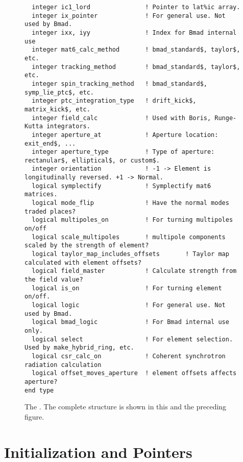 \begin{figure}[tb]
\begin{verbatim}
  integer ic1_lord               ! Pointer to lat%ic array.
  integer ix_pointer             ! For general use. Not used by Bmad.
  integer ixx, iyy               ! Index for Bmad internal use
  integer mat6_calc_method       ! bmad_standard$, taylor$, etc.
  integer tracking_method        ! bmad_standard$, taylor$, etc.
  integer spin_tracking_method   ! bmad_standard$, symp_lie_ptc$, etc.
  integer ptc_integration_type   ! drift_kick$, matrix_kick$, etc.
  integer field_calc             ! Used with Boris, Runge-Kutta integrators.
  integer aperture_at            ! Aperture location: exit_end$, ...
  integer aperture_type          ! Type of aperture: rectanular$, elliptical$, or custom$. 
  integer orientation            ! -1 -> Element is longitudinally reversed. +1 -> Normal.
  logical symplectify            ! Symplectify mat6 matrices.
  logical mode_flip              ! Have the normal modes traded places?
  logical multipoles_on          ! For turning multipoles on/off
  logical scale_multipoles       ! multipole components scaled by the strength of element?
  logical taylor_map_includes_offsets       ! Taylor map calculated with element offsets?
  logical field_master           ! Calculate strength from the field value?
  logical is_on                  ! For turning element on/off.
  logical logic                  ! For general use. Not used by Bmad.
  logical bmad_logic             ! For Bmad internal use only.
  logical select                 ! For element selection. Used by make_hybrid_ring, etc.
  logical csr_calc_on            ! Coherent synchrotron radiation calculation
  logical offset_moves_aperture  ! element offsets affects aperture?          
end type
\end{verbatim}
\caption[The  (part 2).]{The . 
The complete structure is shown in this and the preceding figure.}
\label{f:ele.struct2}
\end{figure}

\section{Initialization and Pointers}

